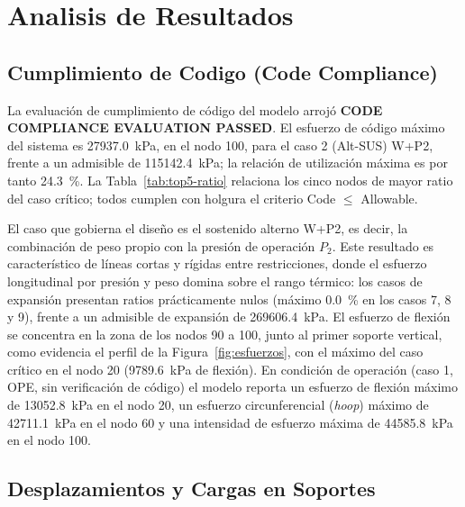 \section{Analisis de Resultados}
\label{sec:analisis}

\subsection{Cumplimiento de Codigo (Code Compliance)}

La evaluaci\'{o}n de cumplimiento de c\'{o}digo del modelo arroj\'{o}
\textbf{CODE COMPLIANCE EVALUATION PASSED}. El esfuerzo de c\'{o}digo
m\'{a}ximo del sistema es \num{27937.0}~\si{kPa}, en el nodo 100, para el caso
2 (Alt-SUS) W+P2, frente a un admisible de \num{115142.4}~\si{kPa}; la
relaci\'{o}n de utilizaci\'{o}n m\'{a}xima es por tanto 24.3~\%. La
Tabla~\ref{tab:top5-ratio} relaciona los cinco nodos de mayor ratio del caso
cr\'{i}tico; todos cumplen con holgura el criterio Code $\leq$ Allowable.



El caso que gobierna el dise\~{n}o es el sostenido alterno W+P2, es decir, la
combinaci\'{o}n de peso propio con la presi\'{o}n de operaci\'{o}n $P_2$. Este
resultado es caracter\'{i}stico de l\'{i}neas cortas y r\'{i}gidas entre
restricciones, donde el esfuerzo longitudinal por presi\'{o}n y peso domina
sobre el rango t\'{e}rmico: los casos de expansi\'{o}n presentan ratios
pr\'{a}cticamente nulos (m\'{a}ximo 0.0~\% en los casos 7, 8 y 9), frente a un
admisible de expansi\'{o}n de \num{269606.4}~\si{kPa}. El esfuerzo de
flexi\'{o}n se concentra en la zona de los nodos 90 a 100, junto al primer
soporte vertical, como evidencia el perfil de la
Figura~\ref{fig:esfuerzos}, con el m\'{a}ximo del caso cr\'{i}tico en el nodo 20
(\num{9789.6}~\si{kPa} de flexi\'{o}n). En condici\'{o}n de
operaci\'{o}n (caso 1, OPE, sin verificaci\'{o}n de c\'{o}digo) el modelo
reporta un esfuerzo de flexi\'{o}n m\'{a}ximo de \num{13052.8}~\si{kPa} en el
nodo 20, un esfuerzo circunferencial (\textit{hoop}) m\'{a}ximo de
\num{42711.1}~\si{kPa} en el nodo 60 y una intensidad de esfuerzo m\'{a}xima de
\num{44585.8}~\si{kPa} en el nodo 100.

\subsection{Desplazamientos y Cargas en Soportes}

